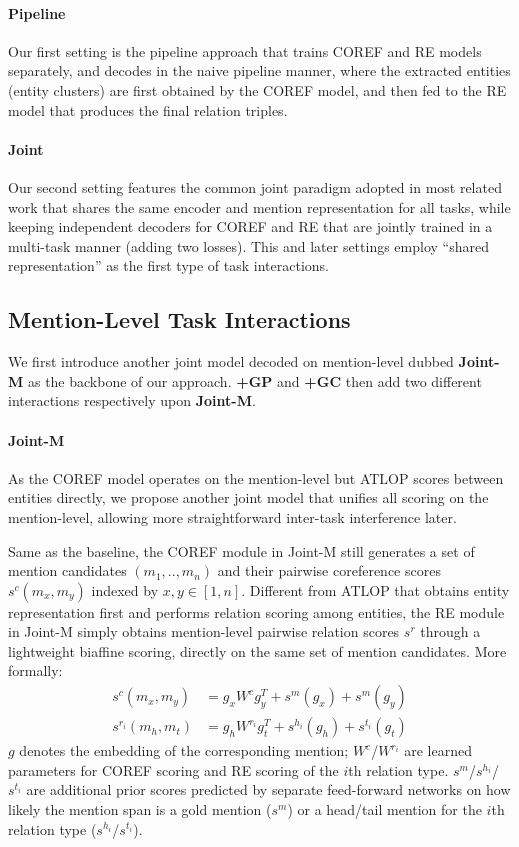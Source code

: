 \documentclass[11pt]{article}
\begin{document}
\paragraph{Pipeline}
Our first setting is the pipeline approach that trains COREF and RE models separately, and decodes in the naive pipeline manner, where the extracted entities (entity clusters) are first obtained by the COREF model, and then fed to the RE model that produces the final relation triples.

\paragraph{Joint}
Our second setting features the common joint paradigm adopted in most related work \cite{dygie,dwie,joint-mil} that shares the same encoder and mention representation for all tasks, while keeping independent decoders for COREF and RE that are jointly trained in a multi-task manner (adding two losses). This and later settings employ ``shared representation'' as the first type of task interactions.


\subsection{Mention-Level Task Interactions}
\label{subsec:interactions}

We first introduce another joint model decoded on mention-level dubbed \textbf{Joint-M} as the backbone of our approach. \textbf{+GP} and \textbf{+GC} then add two different interactions respectively upon \textbf{Joint-M}.

\paragraph{Joint-M}
As the COREF model operates on the mention-level but ATLOP scores between entities directly, we propose another joint model that unifies all scoring on the mention-level, allowing more straightforward inter-task interference later.

Same as the baseline, the COREF module in Joint-M still generates a set of mention candidates $(m_1, .., m_n)$ and their pairwise coreference scores $s^c(m_x, m_y)$ indexed by $x,y \in [1, n]$. Different from ATLOP that obtains entity representation first and performs relation scoring among entities, the RE module in Joint-M simply obtains mention-level pairwise relation scores $s^r$ through a lightweight biaffine scoring, directly on the same set of mention candidates. More formally:
\begin{align}
    s^c(m_x, m_y) &= g_x W^c g_y^T + s^m(g_x) + s^m(g_y) \nonumber \\
    s^{r_i}(m_h, m_t) &= g_h W^{r_i} g_t^T + s^{h_i}(g_h) + s^{t_i}(g_t) \nonumber
\end{align}
$g$ denotes the embedding of the corresponding mention;
$W^c$/$W^{r_i}$ are learned parameters for COREF scoring and RE scoring of the $i$th relation type. $s^m$/$s^{h_i}$/$s^{t_i}$ are additional prior scores predicted by separate feed-forward networks on how likely the mention span is a gold mention ($s^m$) or a head/tail mention for the $i$th relation type ($s^{h_i}$/$s^{t_i}$).
\end{document}
